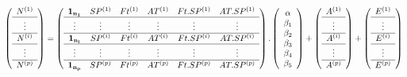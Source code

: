 \documentclass[11pt,fleqn]{book} %
\begin{document}
\begin{equation}
\left (\begin{array}{c}
N^{(1)} \\
\hline
\vdots \\
\hline
N^{(i)} \\
\hline
\vdots \\
\hline
N^{(p)} \\
\end{array}\right) =
\left (\begin{array}{c c c c c c}
 \mathbf{1_{n_1}} & SP^{(1)} & Ft^{(1)} & AT^{(1)} & Ft.SP^{(1)} & AT.SP^{(1)} \\
\hline
\vdots & \vdots & \vdots & \vdots & \vdots & \vdots  \\
\hline
 \mathbf{1_{n_i}} & SP^{(i)} & Ft^{(i)} & AT^{(i)} & Ft.SP^{(i)} & AT.SP^{(i)} \\
\hline
\vdots & \vdots & \vdots & \vdots & \vdots & \vdots  \\
\hline
 \mathbf{1_{n_p}} & SP^{(p)} & Ft^{(p)} & AT^{(p)} & Ft.SP^{(p)} & AT.SP^{(p)}\\
\end{array}\right) .
\left (\begin{array}{c}
\alpha\\
\beta_1 \\
\beta_2 \\
\beta_3 \\
\beta_4 \\
\beta_5 \\
\end{array}\right) +
\left (\begin{array}{c}
 A^{(1)}\\
\hline
\vdots \\
\hline
A^{(i)}\\
\hline
\vdots \\
\hline
A^{(p)}\\

\end{array}\right) +
\left (\begin{array}{c}
 E^{(1)}\\
\hline
\vdots \\
\hline
 E^{(i)}\\
\hline
\vdots \\
\hline
 E^{(p)}\\
\end{array}\right)
\end{equation}

\vspace{1em}
\end{document}
